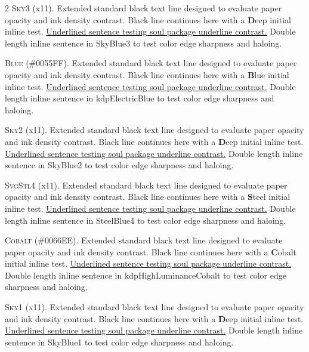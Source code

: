 \begin{multicols}{2}
\lettrine[lines=2]{\textcolor{SkyBlue3}{S}}{ky3} (x11). Extended standard black text line designed to evaluate paper opacity and ink density contrast. Black line continues here with a \textbf{\textcolor{SkyBlue3}{D}}eep initial inline test. \ul{Underlined sentence testing soul package underline contrast.} \textcolor{SkyBlue3}{Double length inline sentence in SkyBlue3 to test color edge sharpness and haloing.}


\lettrine[lines=2]{\textcolor{kdpElectricBlue}{B}}{lue} (\#0055FF). Extended standard black text line designed to evaluate paper opacity and ink density contrast. Black line continues here with a \textbf{\textcolor{kdpElectricBlue}{B}}lue initial inline test. \ul{Underlined sentence testing soul package underline contrast.} \textcolor{kdpElectricBlue}{Double length inline sentence in kdpElectricBlue to test color edge sharpness and haloing.}


\lettrine[lines=2]{\textcolor{SkyBlue2}{S}}{ky2} (x11). Extended standard black text line designed to evaluate paper opacity and ink density contrast. Black line continues here with a \textbf{\textcolor{SkyBlue2}{D}}eep initial inline test. \ul{Underlined sentence testing soul package underline contrast.} \textcolor{SkyBlue2}{Double length inline sentence in SkyBlue2 to test color edge sharpness and haloing.}


\lettrine[lines=2]{\textcolor{SteelBlue4}{S}}{vgStl4} (x11). Extended standard black text line designed to evaluate paper opacity and ink density contrast. Black line continues here with a \textbf{\textcolor{SteelBlue4}{S}}teel initial inline test. \ul{Underlined sentence testing soul package underline contrast.} \textcolor{SteelBlue4}{Double length inline sentence in SteelBlue4 to test color edge sharpness and haloing.}


\lettrine[lines=2]{\textcolor{kdpHighLuminanceCobalt}{C}}{obalt} (\#0066EE). Extended standard black text line designed to evaluate paper opacity and ink density contrast. Black line continues here with a \textbf{\textcolor{kdpHighLuminanceCobalt}{C}}obalt initial inline test. \ul{Underlined sentence testing soul package underline contrast.} \textcolor{kdpHighLuminanceCobalt}{Double length inline sentence in kdpHighLuminanceCobalt to test color edge sharpness and haloing.}


\lettrine[lines=2]{\textcolor{SkyBlue1}{S}}{ky1} (x11). Extended standard black text line designed to evaluate paper opacity and ink density contrast. Black line continues here with a \textbf{\textcolor{SkyBlue1}{D}}eep initial inline test. \ul{Underlined sentence testing soul package underline contrast.} \textcolor{SkyBlue1}{Double length inline sentence in SkyBlue1 to test color edge sharpness and haloing.}



\end{multicols}
